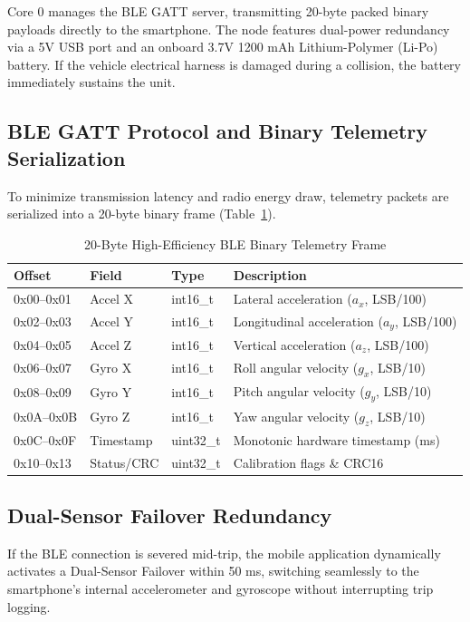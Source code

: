 \documentclass[conference]{IEEEtran}
\begin{document}
Core 0 manages the BLE GATT server, transmitting 20-byte packed binary payloads directly to the smartphone. The node features dual-power redundancy via a 5V USB port and an onboard 3.7V 1200 mAh Lithium-Polymer (Li-Po) battery. If the vehicle electrical harness is damaged during a collision, the battery immediately sustains the unit. 

\subsection{BLE GATT Protocol and Binary Telemetry Serialization}
To minimize transmission latency and radio energy draw, telemetry packets are serialized into a 20-byte binary frame (Table~\ref{tab:ble}).

\begin{table}[htbp]
\caption{20-Byte High-Efficiency BLE Binary Telemetry Frame}
\label{tab:ble}
\centering
\begin{tabular}{llll}
\toprule
\textbf{Offset} & \textbf{Field} & \textbf{Type} & \textbf{Description} \\
\midrule
0x00--0x01 & Accel X & int16\_t & Lateral acceleration ($a_x$, LSB/100) \\
0x02--0x03 & Accel Y & int16\_t & Longitudinal acceleration ($a_y$, LSB/100) \\
0x04--0x05 & Accel Z & int16\_t & Vertical acceleration ($a_z$, LSB/100) \\
0x06--0x07 & Gyro X & int16\_t & Roll angular velocity ($g_x$, LSB/10) \\
0x08--0x09 & Gyro Y & int16\_t & Pitch angular velocity ($g_y$, LSB/10) \\
0x0A--0x0B & Gyro Z & int16\_t & Yaw angular velocity ($g_z$, LSB/10) \\
0x0C--0x0F & Timestamp & uint32\_t & Monotonic hardware timestamp (ms) \\
0x10--0x13 & Status/CRC & uint32\_t & Calibration flags \& CRC16 \\
\bottomrule
\end{tabular}
\end{table}

\subsection{Dual-Sensor Failover Redundancy}
If the BLE connection is severed mid-trip, the mobile application dynamically activates a Dual-Sensor Failover within 50 ms, switching seamlessly to the smartphone's internal accelerometer and gyroscope without interrupting trip logging.
\end{document}
